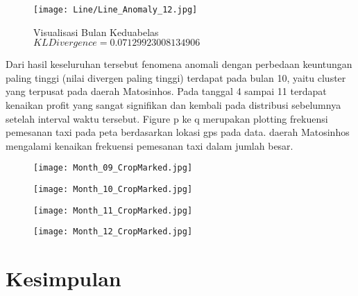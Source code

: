\documentclass{article}
\begin{document}
\begin{figure}[H]
	\centering
	\texttt{[image: Line/Line\_Anomaly\_12.jpg]}
	\caption{Visualisasi Bulan Keduabelas\\$KL Divergence = 0.07129923008134906$}
\end{figure}

Dari hasil keseluruhan tersebut fenomena anomali dengan  perbedaan keuntungan paling tinggi (nilai divergen paling tinggi) terdapat pada bulan 10, yaitu cluster yang terpusat pada daerah Matosinhos. Pada tanggal 4 sampai 11 terdapat kenaikan profit yang sangat signifikan dan kembali pada distribusi sebelumnya setelah interval waktu tersebut. Figure p ke q merupakan  plotting frekuensi pemesanan taxi pada peta berdasarkan lokasi gps pada data. daerah Matosinhos mengalami kenaikan frekuensi pemesanan taxi dalam jumlah besar.

\begin{figure}[H]
	\centering
	\begin{minipage}{.4\textwidth}
		\centering
		\texttt{[image: Month\_09\_CropMarked.jpg]}
	\end{minipage}%
	\hspace{.1\textwidth}
	\begin{minipage}{.4\textwidth}
		\centering
		\texttt{[image: Month\_10\_CropMarked.jpg]}
	\end{minipage}%
\end{figure}

\begin{figure}[H]
	\centering
	\begin{minipage}{.4\textwidth}
		\centering
		\texttt{[image: Month\_11\_CropMarked.jpg]}
	\end{minipage}%
	\hspace{.1\textwidth}
	\begin{minipage}{.4\textwidth}
		\centering
		\texttt{[image: Month\_12\_CropMarked.jpg]}
	\end{minipage}%
\end{figure}

\section{Kesimpulan}
\end{document}
